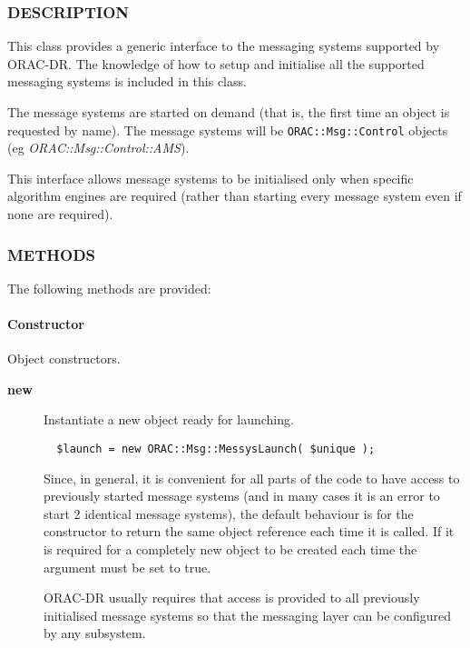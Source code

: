 \subsubsection*{DESCRIPTION\label{ORAC::Msg::MessysLaunch_DESCRIPTION}}


This class provides a generic interface to the messaging systems
supported by ORAC-DR. The knowledge of how to setup and initialise
all the supported messaging systems is included in this class.



The message systems are started on demand (that is, the first
time an object is requested by name). The message systems will
be \texttt{ORAC::Msg::Control} objects (eg \emph{ORAC::Msg::Control::AMS}).



This interface allows message systems to be initialised only
when specific algorithm engines are required (rather than
starting every message system even if none are required).

\subsubsection*{METHODS\label{ORAC::Msg::MessysLaunch_METHODS}}


The following methods are provided:

\paragraph*{Constructor\label{ORAC::Msg::MessysLaunch_Constructor}}


Object constructors.

\begin{description}

\item[\textbf{new}] \mbox{}

Instantiate a new object ready for launching.

\begin{verbatim}
  $launch = new ORAC::Msg::MessysLaunch( $unique );
\end{verbatim}


Since, in general, it is convenient for all parts of the code to have
access to previously started message systems (and in many cases it is
an error to start 2 identical message systems), the default behaviour
is for the constructor to return the same object reference each time
it is called. If it is required for a completely new object to be
created each time the argument must be set to true.



ORAC-DR usually requires that access is provided to all previously
initialised message systems so that the messaging layer can be
configured by any subsystem.

\end{description}
